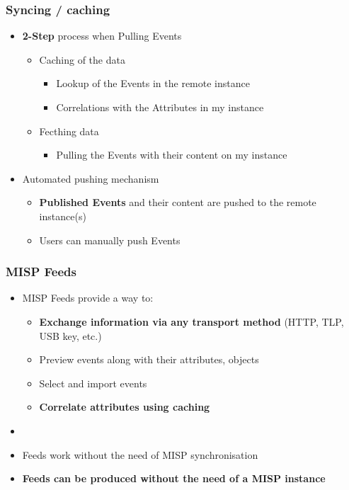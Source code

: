 \begin{frame}
    \frametitle{Syncing / caching}
    \begin{itemize}
        \item \textbf{2-Step} process when Pulling Events
        \begin{itemize}
            \item Caching of the data
            \begin{itemize}
                \item Lookup of the Events in the remote instance
                \item Correlations with the Attributes in my instance
            \end{itemize}
            \item Fecthing data
            \begin{itemize}
                \item Pulling the Events with their content on my instance
            \end{itemize}
        \end{itemize}
        \item Automated pushing mechanism
        \begin{itemize}
            \item \textbf{Published Events} and their content are pushed to the remote instance(s)
            \item Users can manually push Events
        \end{itemize}
    \end{itemize}
\end{frame}

\begin{frame}
    \frametitle{MISP Feeds}
    \begin{itemize}
        \item MISP Feeds provide a way to:
        \begin{itemize}
            \item \textbf{Exchange information via any transport method} (HTTP, TLP, USB key, etc.)
            \item Preview events along with their attributes, objects
            \item Select and import events
            \item \textbf{Correlate attributes using caching}
        \end{itemize}
        \item []
        \item Feeds work without the need of MISP synchronisation
        \item \textbf{Feeds can be produced without the need of a MISP instance}
    \end{itemize}
\end{frame}

